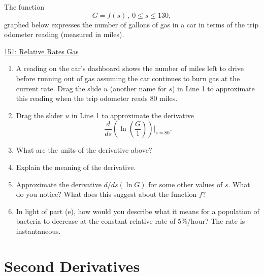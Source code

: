 \documentclass{ximera}
\begin{document}
\begin{question} \label{QPErerDR}
The function
\[
     G =f(s) \, , \, 0\leq s \leq 130 ,
\]
graphed below expresses the number of gallons of gas in a car in terms of the trip odometer reading (measured in miles).


\begin{onlineOnly}
    \begin{center}
\end{center}
\end{onlineOnly}

\href{https://www.desmos.com/calculator/gdeybih5t2}{151: Relative Rates Gas}

\begin{enumerate}

\item A reading on the car's dashboard shows the number of miles left to drive before running out of gas assuming the car continues to burn gas at the current rate. Drag the slide $u$ (another name for $s$) in Line 1 to approximate this reading when the trip odometer reads $80$ miles.

\item Drag the slider $u$ in Line 1 to approximate the derivative 
\[
     \frac{d}{ds} \left(   \ln \left(\frac{G}{1}\right)  \right)\Big|_{s=80}.
\] 

\item What are the units of the derivative above?

\item Explain the meaning of the derivative.

\item Approximate the derivative $d/ds (\ln G)$ for some other values of $s$. What do you notice? What does this suggest about the function $f$?

\item In light of part (e), how would you describe what it means for a population of bacteria to decrease at the constant relative rate of $5\%$/hour? The rate is instantaneous.
\end{enumerate}

\end{question}









\section{Second Derivatives}
\end{document}

